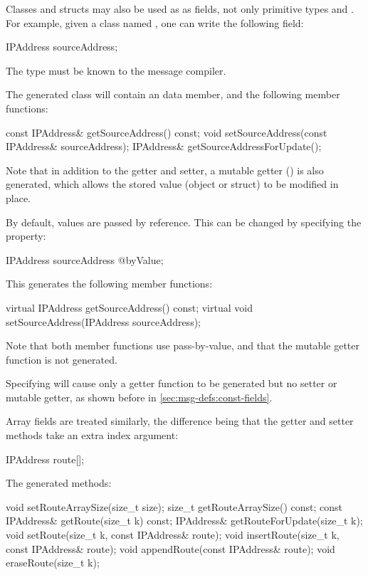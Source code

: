 Classes and structs may also be used as as fields, not only primitive types and
. For example, given a class named , one can write
the following field:

\begin{msg}
IPAddress sourceAddress;
\end{msg}

The  type must be known to the message compiler.

The generated class will contain an  data member, and the
following member functions:

\begin{cpp}
const IPAddress& getSourceAddress() const;
void setSourceAddress(const IPAddress& sourceAddress);
IPAddress& getSourceAddressForUpdate();
\end{cpp}

Note that in addition to the getter and setter, a mutable getter
() is also generated, which allows the stored value (object
or struct) to be modified in place.

By default, values are passed by reference. This can be changed by specifying
the  property:

\begin{msg}
IPAddress sourceAddress @byValue;
\end{msg}

This generates the following member functions:

\begin{cpp}
virtual IPAddress getSourceAddress() const;
virtual void setSourceAddress(IPAddress sourceAddress);
\end{cpp}

Note that both member functions use pass-by-value, and that the mutable getter
function is not generated.

Specifying  will cause only a getter function to be generated
but no setter or mutable getter, as shown before in \ref{sec:msg-defs:const-fields}.

Array fields are treated similarly, the difference being that the getter and setter
methods take an extra index argument:

\begin{msg}
IPAddress route[];
\end{msg}

The generated methods:

\begin{cpp}
void setRouteArraySize(size_t size);
size_t getRouteArraySize() const;
const IPAddress& getRoute(size_t k) const;
IPAddress& getRouteForUpdate(size_t k);
void setRoute(size_t k, const IPAddress& route);
void insertRoute(size_t k, const IPAddress& route);
void appendRoute(const IPAddress& route);
void eraseRoute(size_t k);
\end{cpp}


